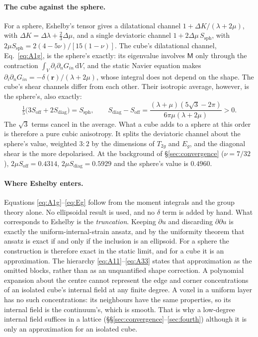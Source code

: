 \documentclass[extra,mreferee]{gji}
\begin{document}
\paragraph{The cube against the sphere.} For a sphere, Eshelby's tensor gives a dilatational
channel $1+\Delta K/(\lambda+2\mu)$, with $\Delta K=\Delta\lambda+\tfrac23\Delta\mu$, and a single
deviatoric channel $1+2\Delta\mu\,S_{\text{sph}}$, with $2\mu S_{\text{sph}}=2(4-5\nu)/[15(1-\nu)]$.
The cube's dilatational channel, Eq.~\eqref{eq:A1g}, is the sphere's exactly: its eigenvalue
involves $\mathsf M$ only through the contraction $\int_V\partial_i\partial_nG_{in}\,\mathrm{d}V$, and the
static Navier equation makes $\partial_i\partial_nG_{in}=-\delta(\mathbf r)/(\lambda+2\mu)$, whose
integral does not depend on the shape. The
cube's shear channels differ from each other. Their isotropic average, however, is the sphere's,
also exactly:
\begin{equation}\label{eq:shearsplit}
  \tfrac15\bigl(3S_{\text{off}}+2S_{\text{diag}}\bigr)=S_{\text{sph}},\qquad
  S_{\text{diag}}-S_{\text{off}}=\frac{(\lambda+\mu)(5\sqrt3-2\pi)}{6\pi\mu(\lambda+2\mu)}>0 .
\end{equation}
The $\sqrt3$ terms cancel in the average. What a cube adds to a sphere at this order is therefore
a pure cubic anisotropy. It splits the deviatoric channel about the sphere's value, weighted $3:2$
by the dimensions of $T_{2g}$ and $E_g$, and the diagonal shear is the more depolarised. At the background of
\S\ref{sec:convergence} ($\nu=7/32$), $2\mu S_{\text{off}}=0.4314$, $2\mu S_{\text{diag}}=0.5929$
and the sphere's value is $0.4960$.

\paragraph{Where Eshelby enters.} Equations \eqref{eq:A1g}--\eqref{eq:Eg} follow from the moment
integrals and the group theory alone. No ellipsoidal result is used, and no $\delta$ term is added
by hand. What corresponds to Eshelby is the \emph{truncation}. Keeping $\partial u$ and discarding
$\partial\partial u$ is exactly the uniform-internal-strain ansatz, and by the uniformity theorem
that ansatz is exact if and only if the inclusion is an ellipsoid. For a sphere the construction
is therefore exact in the static limit, and for a cube it is an approximation. The hierarchy
\eqref{eq:A11}--\eqref{eq:A33} states that approximation as the omitted blocks, rather than as an
unquantified shape correction. A polynomial expansion about the centre cannot represent the edge
and corner concentrations of an isolated cube's internal field at any finite degree. A voxel in a
uniform layer has no such concentrations: its neighbours have the same properties, so its internal
field is the continuum's, which is smooth. That is why a low-degree internal field suffices in a
lattice (\S\S\ref{sec:convergence}--\ref{sec:fourth}) although it is only an approximation for an
isolated cube.
\end{document}
